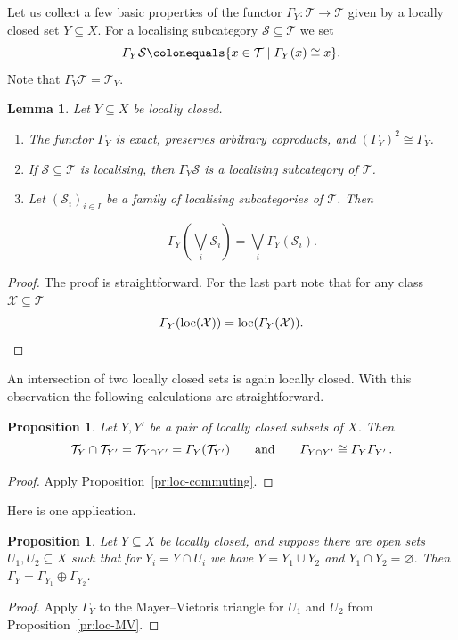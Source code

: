 \documentclass{amsart}[a4]
\newtheorem{lemma}[theorem]{Lemma}
\newtheorem{proposition}[theorem]{Proposition}
\theoremstyle{definition}
\theoremstyle{remark}
\numberwithin{equation}{section}
\newcommand{\loc}{\operatorname{loc}}
\newcommand{\cat}{\mathcal}
\let\Gamma\varGamma
\begin{document}
Let us collect a few basic properties of the functor
$\Gamma_Y\colon\cat T\to\cat T$ given by a locally closed set
$Y\subseteq X$. For a localising subcategory $\cat S\subseteq\cat T$
we set
\[\Gamma_Y\cat S\colonequals\{x\in\cat T\mid \Gamma_Y(x)\cong x\}.\]
Note that $\Gamma_Y\cat T=\cat T_Y$.

\begin{lemma}
Let $Y\subseteq X$ be locally closed.          
  \begin{enumerate}
    \item The functor $\Gamma_Y$ is exact, preserves arbitrary
      coproducts, and $(\Gamma_Y)^2\cong\Gamma_Y$.
      \item If $\cat S\subseteq\cat T$ is localising, then $\Gamma_Y\cat S$
        is a localising subcategory of $\cat T$.
\item Let $(\cat S_i)_{i\in I}$ be a family of localising
  subcategories of $\cat T$. Then

   \[\Gamma_Y\left(\bigvee_i \cat S_i\right)=\bigvee_i \Gamma_Y(\cat
    S_i).\]
\end{enumerate}
\end{lemma}
\begin{proof}
  The proof is straightforward. For the last part note that for any class $\cat
  X\subseteq\cat T$
  \[\Gamma_Y(\loc(\cat X))=\loc(\Gamma_Y(\cat X)).\qedhere\]
\end{proof}


        
An intersection of two locally closed sets is again locally closed. With
this observation the following calculations are straightforward.

\begin{proposition}\label{pr:loc-closed} 
  Let $Y,Y'$ be a pair of locally closed subsets of $X$. Then
  \[\cat T_Y\cap\cat T_{Y'}=\cat T_{Y\cap Y'}=\Gamma_Y(\cat T_{Y'})\qquad\text{and}\qquad
\Gamma_{Y\cap Y'}\cong     \Gamma_Y \Gamma_{Y'}\,.\qedhere\] 
\end{proposition}
\begin{proof}
  Apply Proposition~\ref{pr:loc-commuting}.
\end{proof}

Here is one application.

\begin{proposition}\label{pr:loc-closed-MV}
Let $Y\subseteq X$ be locally closed, and suppose there are open sets
$U_1,U_2\subseteq X$ such that for $Y_i=Y\cap U_i$ we have $Y=Y_1\cup
Y_2$ and $Y_1\cap Y_2=\varnothing$. Then $\Gamma_Y=\Gamma_{Y_1}\oplus\Gamma_{Y_2}$.
\end{proposition}
\begin{proof}
  Apply $\Gamma_Y$ to the Mayer--Vietoris triangle for $U_1$ and $U_2$
  from Proposition~\ref{pr:loc-MV}.
\end{proof}
\end{document}
